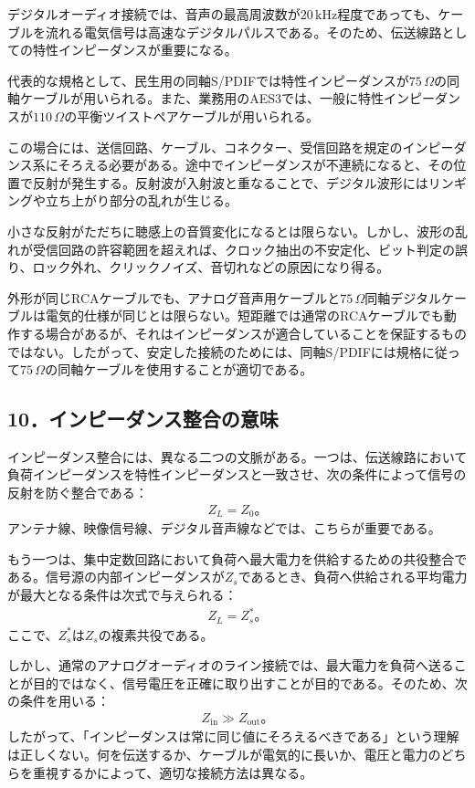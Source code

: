 \documentclass[platex,dvipdfmx,a4paper]{jsarticle}
\begin{document}
デジタルオーディオ接続では、音声の最高周波数が$20\,\mathrm{kHz}$程度であっても、ケーブルを流れる電気信号は高速なデジタルパルスである。そのため、伝送線路としての特性インピーダンスが重要になる。

代表的な規格として、民生用の同軸S/PDIFでは特性インピーダンスが$75\,\Omega$の同軸ケーブルが用いられる。また、業務用のAES3では、一般に特性インピーダンスが$110\,\Omega$の平衡ツイストペアケーブルが用いられる。

この場合には、送信回路、ケーブル、コネクター、受信回路を規定のインピーダンス系にそろえる必要がある。途中でインピーダンスが不連続になると、その位置で反射が発生する。反射波が入射波と重なることで、デジタル波形にはリンギングや立ち上がり部分の乱れが生じる。

小さな反射がただちに聴感上の音質変化になるとは限らない。しかし、波形の乱れが受信回路の許容範囲を超えれば、クロック抽出の不安定化、ビット判定の誤り、ロック外れ、クリックノイズ、音切れなどの原因になり得る。

外形が同じRCAケーブルでも、アナログ音声用ケーブルと$75\,\Omega$同軸デジタルケーブルは電気的仕様が同じとは限らない。短距離では通常のRCAケーブルでも動作する場合があるが、それはインピーダンスが適合していることを保証するものではない。したがって、安定した接続のためには、同軸S/PDIFには規格に従って$75\,\Omega$の同軸ケーブルを使用することが適切である。

\subsection*{10．インピーダンス整合の意味}

インピーダンス整合には、異なる二つの文脈がある。一つは、伝送線路において負荷インピーダンスを特性インピーダンスと一致させ、次の条件によって信号の反射を防ぐ整合である：
\begin{align*}
  Z_L=Z_0。
\end{align*}
アンテナ線、映像信号線、デジタル音声線などでは、こちらが重要である。

もう一つは、集中定数回路において負荷へ最大電力を供給するための共役整合である。信号源の内部インピーダンスが$Z_s$であるとき、負荷へ供給される平均電力が最大となる条件は次式で与えられる：
\begin{align*}
  Z_L=Z_s^*。
\end{align*}
ここで、$Z_s^*$は$Z_s$の複素共役である。

しかし、通常のアナログオーディオのライン接続では、最大電力を負荷へ送ることが目的ではなく、信号電圧を正確に取り出すことが目的である。そのため、次の条件を用いる：
\begin{align*}
  Z_{\mathrm{in}}\gg Z_{\mathrm{out}}。
\end{align*}
したがって、「インピーダンスは常に同じ値にそろえるべきである」という理解は正しくない。何を伝送するか、ケーブルが電気的に長いか、電圧と電力のどちらを重視するかによって、適切な接続方法は異なる。
\end{document}
